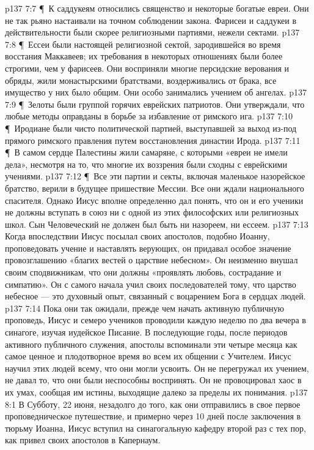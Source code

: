 \vs p137 7:7 \P\ К саддукеям относились священство и некоторые богатые евреи. Они не так рьяно настаивали на точном соблюдении закона. Фарисеи и саддукеи в действительности были скорее религиозными партиями, нежели сектами.
\vs p137 7:8 \P\ Ессеи были настоящей религиозной сектой, зародившейся во время восстания Маккавеев; их требования в некоторых отношениях были более строгими, чем у фарисеев. Они восприняли многие персидские верования и обряды, жили монастырскими братствами, воздерживались от брака, все имущество у них было общим. Они особо занимались учением об ангелах.
\vs p137 7:9 \P\ Зелоты были группой горячих еврейских патриотов. Они утверждали, что любые методы оправданы в борьбе за избавление от римского ига.
\vs p137 7:10 \P\ Иродиане были чисто политической партией, выступавшей за выход из\hyp{}под прямого римского правления путем восстановления династии Ирода.
\vs p137 7:11 \P\ В самом сердце Палестины жили самаряне, с которыми «евреи не имели дела», несмотря на то, что многие их воззрения были сходны с еврейскими учениями.
\vs p137 7:12 \P\ Все эти партии и секты, включая маленькое назорейское братство, верили в будущее пришествие Мессии. Все они ждали национального спасителя. Однако Иисус вполне определенно дал понять, что он и его ученики не должны вступать в союз ни с одной из этих философских или религиозных школ. Сын Человеческий не должен был быть ни назореем, ни ессеем.
\vs p137 7:13 Когда впоследствии Иисус посылал своих апостолов, подобно Иоанну, проповедовать учение и наставлять верующих, он придавал особое значение провозглашению «благих вестей о царствие небесном». Он неизменно внушал своим сподвижникам, что они должны «проявлять любовь, сострадание и симпатию». Он с самого начала учил своих последователей тому, что царство небесное --- это духовный опыт, связанный с воцарением Бога в сердцах людей.
\vs p137 7:14 Пока они так ожидали, прежде чем начать активную публичную проповедь, Иисус и семеро учеников проводили каждую неделю по два вечера в синагоге, изучая иудейское Писание. В последующие годы, после периодов активного публичного служения, апостолы вспоминали эти четыре месяца как самое ценное и плодотворное время во всем их общении с Учителем. Иисус научил этих людей всему, что они могли усвоить. Он не перегружал их учением, не давал то, что они были неспособны воспринять. Он не провоцировал хаос в их умах, сообщая им истины, выходящие далеко за пределы их понимания.
\vs p137 8:1 В Субботу, 22 июня, незадолго до того, как они отправились в свое первое проповедническое путешествие, и примерно через 10 дней после заключения в тюрьму Иоанна, Иисус вступил на синагогальную кафедру второй раз с тех пор, как привел своих апостолов в Капернаум.
